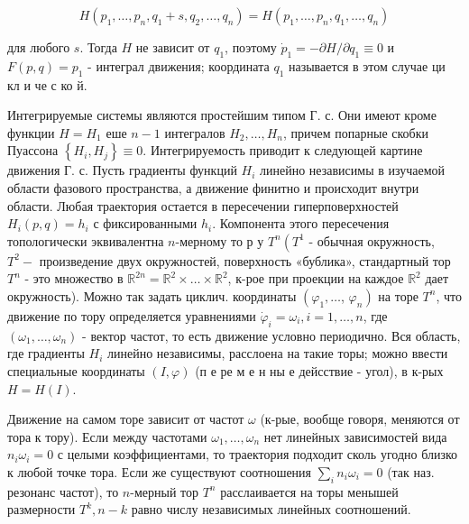 \documentclass[10pt]{article}
\begin{document}
\[

H\left(p_{1}, \ldots, p_{n}, q_{1}+s, q_{2}, \ldots, q_{n}\right)=H\left(p_{1}, \ldots, p_{n}, q_{1}, \ldots, q_{n}\right)

\]



для любого $s$. Тогда $H$ не зависит от $q_{1}$, поэтому $\dot{p}_{1}=-\partial H / \partial q_{1} \equiv 0$ и $F(p, q)=p_{1}$ - интеграл движения; координата $q_{1}$ называется в этом случае ци кл и че с ко й.



Интегрируемые системы являются простейшим типом Г. с. Они имеют кроме функции $H=H_{1}$ еше $n-1$ интегралов $H_{2}, \ldots, H_{n}$, причем попарные скобки Пуассона $\left\{H_{i}, H_{j}\right\} \equiv 0$. Интегрируемость приводит к следующей картине движения Г. с. Пусть градиенты функций $H_{i}$ линейно независимы в изучаемой области фазового пространства, а движение финитно и происходит внутри области. Любая траектория остается в пересечении гиперповерхностей $H_{i}(p, q)=h_{i}$ с фиксированными $h_{i}$. Компонента этого пересечения топологически эквивалентна $n$-мерному то р у $T^{n}\left(T^{1}\right.$ - обычная окружность, $T^{2}-$ произведение двух окружностей, поверхность «бублика», стандартный тор $T^{n}$ - это множество в $\mathbb{R}^{2 n}=\mathbb{R}^{2} \times \ldots \times \mathbb{R}^{2}$, к-рое при проекции на каждое $\mathbb{R}^{2}$ дает окружность). Можно так задать циклич. координаты $\left(\varphi_{1}, \ldots\right.$, $\left.\varphi_{n}\right)$ на торе $T^{n}$, что движение по тору определяется уравнениями $\dot{\varphi}_{i}=\omega_{i}, i=1, \ldots, n$, где $\left(\omega_{1}, \ldots, \omega_{n}\right)$ - вектор частот, то есть движение условно периодично. Вся область, где градиенты $H_{i}$ линейно независимы, расслоена на такие торы; можно ввести специальные координаты $(I, \varphi)$ (п е ре м е н ны е дейсствие - угол), в к-рых $H=H(I)$.



Движение на самом торе зависит от частот $\omega$ (к-рые, вообще говоря, меняются от тора к тору). Если между частотами $\omega_{1}, \ldots, \omega_{n}$ нет линейных зависимостей вида $n_{i} \omega_{i}=0$ с целыми коэффициентами, то траектория подходит сколь угодно близко к любой точке тора. Если же существуют соотношения $\sum_{i} n_{i} \omega_{i}=0$ (так наз. резонанс частот), то $n$-мерный тор $T^{n}$ расслаивается на торы менышей размерности $T^{k}, n-k$ равно числу независимых линейных соотношений.
\end{document}
